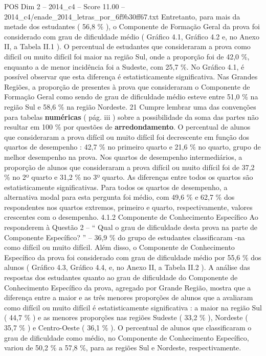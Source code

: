 \begin{textsample}{POS Dim 2 – 2014\_c4 – Score 11.00 – 2014\_c4/enade\_2014\_letras\_por\_6f9b30ff67.txt}
Entretanto, para mais da metade dos estudantes ( 56,8 \% ), o Componente de Formação Geral da prova foi considerado com grau de dificuldade médio ( Gráfico 4.1, Gráfico 4.2 e, no Anexo II, a Tabela II.1 ).
O percentual de estudantes que consideraram a prova como difícil ou muito difícil foi maior na região Sul, onde a proporção foi de 42,0 \%, enquanto a de menor incidência foi a Sudeste, com 25,7 \%.
No Gráfico 4.1, é possível observar que esta diferença é estatisticamente significativa.
Nas Grandes Regiões, a proporção de presentes à prova que consideraram o Componente de Formação Geral como sendo de grau de dificuldade médio esteve entre 51,0 \% na região Sul e 58,6 \% na região Nordeste. 21 Cumpre lembrar uma das convenções para tabelas \textbf{numéricas} ( pág. iii ) sobre a possibilidade da soma das partes não resultar em 100 \% por questões de \textbf{arredondamento}.
O percentual de alunos que consideraram a prova difícil ou muito difícil foi decrescente em função dos quartos de desempenho : 42,7 \% no primeiro quarto e 21,6 \% no quarto, grupo de melhor desempenho na prova.
Nos quartos de desempenho intermediários, a proporção de alunos que consideraram a prova difícil ou muito difícil foi de 37,2 \% no 2º quarto e 31,2 \% no 3º quarto.
As diferenças entre todos os quartos são estatisticamente significativas.
Para todos os quartos de desempenho, a alternativa modal para esta pergunta foi médio, com 49,6 \% e 62,7 \% dos respondentes nos quartos extremos, primeiro e quarto, respectivamente, valores crescentes com o desempenho. 4.1.2 Componente de Conhecimento Específico Ao responderem à Questão 2 – “ Qual o grau de dificuldade desta prova na parte de Componente Específico? ” – 36,9 \% do grupo de estudantes classificaram -na como difícil ou muito difícil.
Além disso, o Componente de Conhecimento Específico da prova foi considerado com grau de dificuldade médio por 55,6 \% dos alunos ( Gráfico 4.3, Gráfico 4.4, e, no Anexo II, a Tabela II.2 ).
A análise das respostas dos estudantes quanto ao grau de dificuldade do Componente de Conhecimento Específico da prova, agregado por Grande Região, mostra que a diferença entre a maior e as três menores proporções de alunos que a avaliaram como difícil ou muito difícil é estatisticamente significativa : a maior na região Sul ( 44,7 \% ) e as menores proporções nas regiões Sudeste ( 33,2 \% ), Nordeste ( 35,7 \% ) e Centro-Oeste ( 36,1 \% ).
O percentual de alunos que classificaram o grau de dificuldade como médio, no Componente de Conhecimento Específico, variou de 50,2 \% a 57,8 \%, para as regiões Sul e Nordeste, respectivamente.

\end{textsample}
